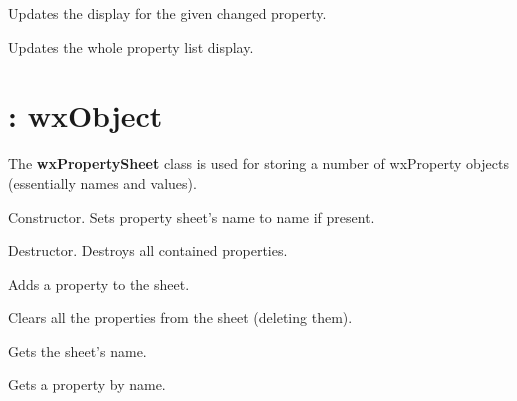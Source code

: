 Updates the display for the given changed property.

\label{wxpropertylistviewupdateproplist}


Updates the whole property list display.


\section{: wxObject}\label{wxpropertysheet}


The {\bf wxPropertySheet} class is used for storing a number of
wxProperty objects (essentially names and values).



Constructor. Sets property sheet's name to name if present.



Destructor. Destroys all contained properties.

\label{wxpropertysheetaddproperty}


Adds a property to the sheet.

\label{wxpropertysheetclear}


Clears all the properties from the sheet (deleting them).

\label{wxpropertysheetgetname}


Gets the sheet's name.

\label{wxpropertysheetgetproperty}


Gets a property by name.

